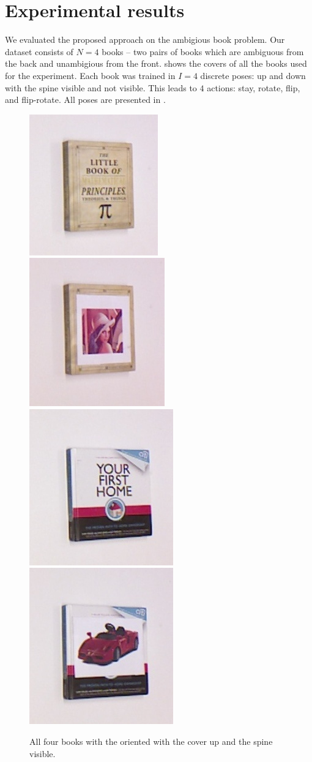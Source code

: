 \section{Experimental results}

    We evaluated the proposed approach on the ambigious book problem. Our dataset consists of $N = 4$ books -- two pairs of books which are ambiguous from the back and unambigious from the front.  shows the covers of all the books used for the experiment. Each book was trained in $I = 4$ discrete poses: up and down with the spine visible and not visible. This leads to $4$ actions: stay, rotate, flip, and flip-rotate. All poses are presented in . 
    
    \begin{figure}[h]
        \centering
        \includegraphics[width = 0.2\columnwidth]{pics/math_cover1_ok.jpg}
        \includegraphics[width = 0.2\columnwidth]{pics/math_cover2_ok.jpg}
        \includegraphics[width = 0.2\columnwidth]{pics/first_cover1.jpg}
        \includegraphics[width = 0.2\columnwidth]{pics/first_cover2.jpg}
        \caption{All four books with the oriented with the cover up and the spine visible.}
        \label{fig:object_dataset} %
    \end{figure}

